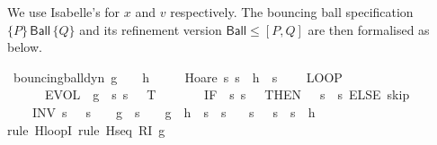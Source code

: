 \documentclass[envcountsame,envcountsect]{llncs}
\begin{document}
\begin{example}
We use Isabelle's  for $x$ and $v$ respectively. The bouncing ball specification $\{P\}\, \mathsf{Ball}\, \{Q\}$ and its refinement version $\mathsf{Ball}\leq [P,Q]$ are then formalised as below. 
\begin{isabellebody}
\isanewline
{}\isamarkupfalse%
\ bouncing{\isacharunderscore}ball{\isacharunderscore}dyn{\isacharcolon}\ {\isachardoublequoteopen}g\ {\isacharless}\ {}\ {\isasymLongrightarrow}\ h\ {\isasymge}\ {}\ {\isasymLongrightarrow}\isanewline
\ \ Hoare\ {\isasymlceil}{\isasymlambda}s{\isachardot}\ s{\isachardollar}{}\ {\isacharequal}\ h\ {\isasymand}\ s{\isachardollar}{}\ {\isacharequal}\ {}{\isasymrceil}\isanewline
\ \ {\isacharparenleft}LOOP\ \isanewline
\ \ \ \ \ \ {\isacharparenleft}{\isacharparenleft}EVOL\ {\isacharparenleft}{\isasymphi}\ g{\isacharparenright}\ {\isacharparenleft}{\isasymlambda}\ s{\isachardot}\ s{\isachardollar}{}\ {\isasymge}\ {}{\isacharparenright}\ T{\isacharparenright}{\isacharsemicolon}\isanewline
\ \ \ \ \ \ \ {\isacharparenleft}IF\ {\isacharparenleft}{\isasymlambda}\ s{\isachardot}\ s{\isachardollar}{}\ {\isacharequal}\ {}{\isacharparenright}\ THEN\ {\isacharparenleft}{}\ {\isacharcolon}{\isacharcolon}{\isacharequal}\ {\isacharparenleft}{\isasymlambda}s{\isachardot}\ {\isacharminus}\ s{\isachardollar}{}{\isacharparenright}{\isacharparenright}\ ELSE\ skip{\isacharparenright}{\isacharparenright}\ \isanewline
\ \ \ \ INV\ {\isacharparenleft}{\isasymlambda}s{\isachardot}\ {}\ {\isasymle}\ s{\isachardollar}{}\ {\isasymand}\ {}\ {\isasymcdot}\ g\ {\isasymcdot}\ s{\isachardollar}{}\ {\isacharequal}\ {}\ {\isasymcdot}\ g\ {\isasymcdot}\ h\ {\isacharplus}\ s{\isachardollar}{}\ {\isasymcdot}\ s{\isachardollar}{}{\isacharparenright}\isanewline
\ \ {\isacharparenright}\ {\isasymlceil}{\isasymlambda}s{\isachardot}\ {}\ {\isasymle}\ s{\isachardollar}{}\ {\isasymand}\ s{\isachardollar}{}\ {\isasymle}\ h{\isasymrceil}{\isachardoublequoteclose}\isanewline
\ \isamarkupfalse%
{\isacharparenleft}rule\ H{\isacharunderscore}loopI{\isacharcomma}\ rule\ H{\isacharunderscore}seq{\isacharbrackleft}\ R{\isacharequal}{\isachardoublequoteopen}I\ g{\isachardoublequoteclose}{\isacharbrackright}{\isacharparenright}\ \isamarkupfalse%

\end{isabellebody}
\end{example}
\end{document}
